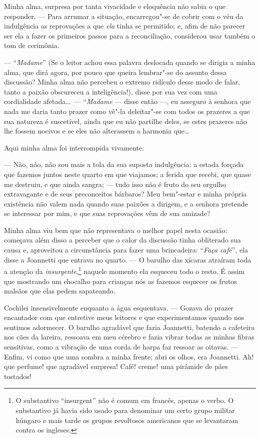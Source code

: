  Minha alma, surpresa por tanta vivacidade e eloquência não sabia o que
responder. --- Para arrumar a situação, encarregou"-se de cobrir com o
véu da indulgência as reprovações a que \textit{ela} tinha se
permitido; e, afim de não parecer ser ela a fazer os primeiros passos
para a reconciliação, considerou usar também o tom de cerimônia.

 --- ``\textit{Madame}'' (Se o leitor achou essa palavra deslocada quando
se dirigia a minha alma, que dirá agora, por pouco que queira
lembrar"-se do assunto dessa discussão? Minha alma não percebeu o
extremo ridículo desse modo de falar, tanto a paixão obscureceu a
inteligência!), disse por sua vez com uma cordialidade afetada\ldots\ ---
``\textit{Madame} --- disse então ---, eu asseguro à senhora que nada me daria
tanto prazer como vê"-la deleitar"-se com todos os prazeres a que sua
natureza é suscetível, ainda que eu não partilhe deles, se estes
prazeres não lhe fossem nocivos e se eles não alterassem a harmonia que\ldots

Aqui minha alma foi interrompida vivamente: 

--- Não, não, não sou mais a tola da sua suposta indulgência: a estada
forçada que fazemos juntos neste quarto em que viajamos; a ferida que
recebi, que quase me destruiu, e que ainda sangra; --- tudo isso não é
fruto do seu orgulho extravagante e de seus preconceitos bárbaros? Meu
bem"-estar e minha própria existência não valem nada quando suas paixões
a dirigem, e a senhora pretende se interessar por mim, e que suas
reprovações vêm de sua amizade?

 Minha alma viu bem que não representava o melhor papel nesta
ocasião:  começava além disso a perceber que o calor da discussão tinha
obliterado sua causa e, aproveitou a circunstância para fazer uma
brincadeira: ``\textit{Faça café}'', ela disse a Joannetti que entrava no
quarto. --- O barulho das xícaras atraíram toda a atenção da
\textit{insurgente},\footnote{ O substantivo ``insurgent'' não é comum em
francês, apenas o verbo. O substantivo já havia sido usado para
denominar um certo grupo militar húngaro e mais tarde os grupos
revoltosos americanos que se levantaram contra os \mbox{ingleses.}} 
naquele momento ela esqueceu todo o resto. É assim que mostrando um
chocalho para crianças nós as fazemos esquecer os frutos malsãos que
elas pedem sapateando.

 Cochilei insensivelmente enquanto a água esquentava. --- Gozava do
prazer encantador com que entretive meus leitores e que experimentamos
quando nos sentimos adormecer. O barulho agradável que fazia Joannetti,
batendo a cafeteira nos cães da lareira, ressoava em meu cérebro e
fazia vibrar todas as minhas fibras sensitivas, como a vibração de uma
corda de harpa faz ressoar as oitavas. --- Enfim, vi como que uma
sombra a minha frente; abri os olhos, era Joannetti. Ah! que perfume!
que agradável surpresa! Café! creme! uma pirâmide de pães tostados!

